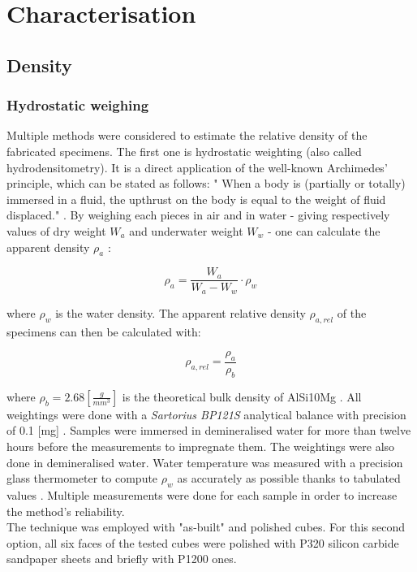\section{Characterisation}

\subsection{Density}

\subsubsection{Hydrostatic weighing}

Multiple methods were considered to estimate the relative density of the fabricated specimens. The first one is hydrostatic weighting (also called hydrodensitometry). It is a direct application of the well-known Archimedes' principle, which can be stated as follows: " When a body is (partially or totally) immersed in a fluid, the upthrust on the body is equal to the weight of fluid displaced." \parencite{ADictionaryofPhysics}. By weighing each pieces in air and in water - giving respectively values of dry weight $W_a$ and underwater weight $W_w$ - one can calculate the apparent density $\rho_a$ \parencite{MethArch}:

$$\rho_a=\frac{W_a}{W_a-W_w} \cdot \rho_w $$

where $\rho_w$ is the water density. The apparent relative density $\rho_{a,rel}$ of the specimens can then be calculated with:

$$\rho_{a,rel} = \frac{\rho_a}{\rho_b} $$

where $\rho_b = 2.68 [\frac{g}{mm^3}]$ is the theoretical bulk density of AlSi10Mg \parencite{Bulk}. All weightings were done with a \textit{Sartorius BP121S} analytical balance with precision of 0.1 [mg] \parencite{Balance}. Samples were immersed in demineralised water for more than twelve hours before the measurements to impregnate them. The weightings were also done in demineralised water. Water temperature was measured with a precision glass thermometer to compute $\rho_w$ as accurately as possible thanks to tabulated values \parencite{Eau}. Multiple measurements were done for each sample in order to increase the method's reliability. \\

The technique was employed with "as-built" and polished cubes. For this second option, all six faces of the tested cubes were polished with P320 silicon carbide sandpaper sheets and briefly with P1200 ones.\\

